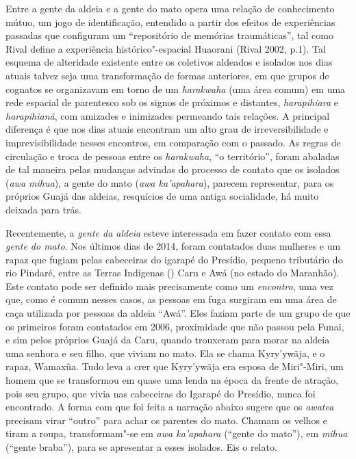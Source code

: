 Entre a gente da aldeia e a gente do mato opera uma relação de
conhecimento mútuo, um jogo de identificação, entendido a partir dos
efeitos de experiências passadas que configuram um ``repositório de
memórias traumáticas'', tal como Rival define a experiência
histórico"-espacial Huaorani (Rival 2002, p.1). Tal esquema de alteridade
existente entre os coletivos aldeados e isolados nos dias atuais talvez
seja uma transformação de formas anteriores, em que grupos de cognatos
se organizavam em torno de um \emph{harakwaha} (uma área comum) em uma
rede espacial de parentesco sob os signos de próximos e distantes,
\emph{harapihiara} e \emph{harapihianã}, com amizades e inimizades
permeando tais relações. A principal diferença é que nos dias atuais
encontram um alto grau de irreversibilidade e imprevisibilidade nesses
encontros, em comparação com o passado. As regras de circulação e troca
de pessoas entre os \emph{harakwaha}, ``o território'', foram abaladas de
tal maneira pelas mudanças advindas do processo de contato que os
isolados (\emph{awa mihua}), a gente do mato (\emph{awa ka'apahara}),
parecem representar, para os próprios Guajá das aldeias, resquícios de
uma antiga socialidade, há muito deixada para trás.

Recentemente, a \emph{gente da aldeia} esteve interessada em fazer
contato com essa \emph{gente do mato}. Nos últimos dias de 2014, foram
contatados duas mulheres e um rapaz que fugiam pelas cabeceiras do
igarapé do Presídio, pequeno tributário do rio Pindaré, entre as Terras
Indígenas () Caru e Awá (no estado do Maranhão). Este contato pode ser
definido mais precisamente como um \emph{encontro}, uma vez que, como é
comum nesses casos, as pessoas em fuga surgiram em uma área de caça
utilizada por pessoas da aldeia ``Awá''. Eles faziam parte de um grupo
de que os primeiros foram contatados em 2006, proximidade que não passou
pela Funai, e sim pelos próprios Guajá da  Caru, quando trouxeram para
morar na aldeia uma senhora e seu filho, que viviam no mato. Ela se
chama Kyry'ywãja, e o rapaz, Wamaxũa. Tudo leva a crer que Kyry'ywãja
era esposa de Miri"-Miri, um homem que se transformou em quase uma lenda
na época da frente de atração, pois seu grupo, que vivia nas cabeceiras
do Igarapé do Presídio, nunca foi encontrado. A forma com que foi feita
a narração abaixo sugere que os \emph{awatea} precisam virar ``outro''
para achar os parentes do mato. Chamam os velhos e tiram a roupa,
transformam"-se em \emph{awa ka'apahara} (``gente do mato''), em
\emph{mihua} (``gente braba''), para se apresentar a esses isolados. Eis
o relato.

